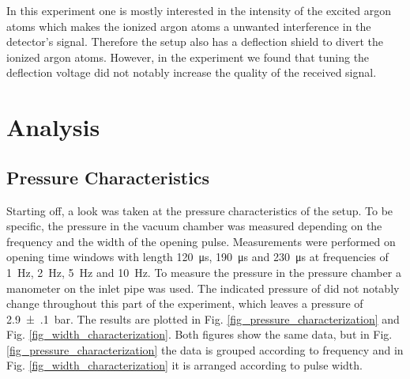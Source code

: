 \documentclass[a4paper,10pt]{article}
\begin{document}
In this experiment one is mostly interested in the intensity of the excited argon atoms which makes the ionized argon atoms a unwanted interference in the detector's signal. Therefore the setup also has a deflection shield to divert the ionized argon atoms. However, in the experiment we found that tuning the deflection voltage did not notably increase the quality of the received signal.

\section{Analysis}
\subsection{Pressure Characteristics}
Starting off, a look was taken at the pressure characteristics of the setup. To be specific, the pressure in the vacuum chamber was measured depending on the frequency and the width of the opening pulse. Measurements were performed on opening time windows with length \SI{120}{\micro \s}, \SI{190}{\micro \s} and \SI{230}{\micro \s} at frequencies of \SI{1}{\hertz}, \SI{2}{\hertz}, \SI{5}{\hertz} and \SI{10}{\hertz}. To measure the pressure in the pressure chamber a manometer on the inlet pipe was used. The indicated pressure of did not notably change throughout this part of the experiment, which leaves a pressure of \SI{2.9(1)}{\bar}. The results are plotted in Fig. \ref{fig_pressure_characterization} and Fig. \ref{fig_width_characterization}. Both figures show the same data, but in Fig. \ref{fig_pressure_characterization} the data is grouped according to frequency and in Fig. \ref{fig_width_characterization} it is arranged according to pulse width.
\end{document}

